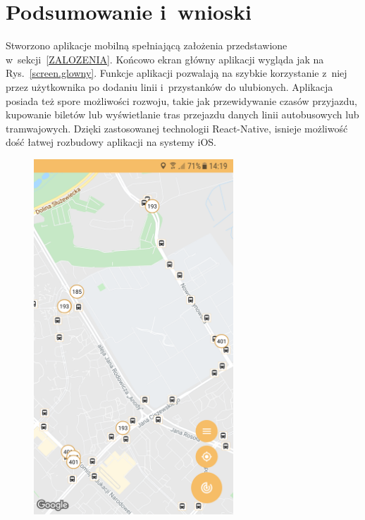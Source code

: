 \documentclass{SGGW-thesis}
\begin{document}
\chapter{Podsumowanie i~wnioski}
Stworzono aplikacje mobilną spełniającą założenia przedstawione w~sekcji~\ref{ZALOZENIA}.
Końcowo ekran główny aplikacji wygląda jak na Rys.~\ref{screen.glowny}.
Funkcje aplikacji pozwalają na szybkie korzystanie z~niej przez użytkownika po dodaniu linii i~przystanków do ulubionych.
Aplikacja posiada też spore możliwości rozwoju, takie jak przewidywanie czasów przyjazdu, kupowanie biletów lub wyświetlanie tras przejazdu danych linii autobusowych lub tramwajowych.
Dzięki zastosowanej technologii React-Native, isnieje możliwość dość łatwej rozbudowy aplikacji na systemy iOS.
\begin{figure}
  \centering
  \includegraphics[width=75mm]{screeny/glowny_jasny}
  \enspace

\end{figure}
\end{document}

